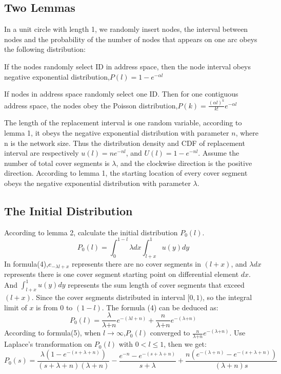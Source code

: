 \documentclass[10pt]{article}
\begin{document}
\subsection{Two Lemmas}
In a unit circle with length 1, we randomly insert   nodes, the interval between nodes and the probability of the number of nodes that appears on one arc obeys the following distribution: 
\begin{lemma}
    If the nodes randomly select ID in address space, then the node interval obeys negative exponential distribution,$P(l)=1-e^{-\alpha{l}}$
\end{lemma}
\begin{lemma}
    If nodes in address space randomly select one ID. Then for one contiguous address space, the nodes obey the Poisson distribution,$P(k)=\frac{(\alpha{l})^k}{k!}e^{-\alpha{l}}$
\end{lemma}
 The length of the replacement interval is one random variable, according to lemma 1,  it obeys the negative exponential distribution with parameter $n$, where n is the network size. Thus the distribution density and CDF of replacement interval are respectively $u(l)=ne^{-nl}$, and $U(l)=1-e^{-nl}$. Assume the number of total cover segments is $\lambda$, and the clockwise direction is the positive direction. According to lemma 1, the starting location of every cover segment obeys the negative exponential distribution with parameter $\lambda$.
 \subsection{The Initial Distribution}
 According to lemma 2, calculate the initial distribution $P_0(l)$.
 \begin{equation}
    P_0(l)=\int _{0}^{1-l}\lambda{dx}\int _{l+x}^{1}u(y)dy
 \end{equation}
 In formula(4),$e_{-\lambda{l+x}}$ represents there are no cover segments in $(l+x)$, and $\lambda{dx}$ represents there is one cover segment starting point on  differential element $dx$. And $\int _{l+x}^{1}u(y)dy$ represents the sum length of cover segments that exceed $(l+x)$. Since the cover segments distributed in interval $[0,1)$, so the  integral limit of $x$ is from $0$ to $(1-l)$.  The formula (4) can be deduced as: 
\begin{equation}
    P_0(l)=\frac{\lambda}{\lambda{+n}}e^{-(\lambda{l}+n)}+\frac{n}{\lambda{+n}}e^{-(\lambda{+n})}
\end{equation}
According to formula(5), when $l\to \infty$,$P_0(l)$ converged to $\frac{n}{\lambda{+n}}e^{-(\lambda{+n})}$. Use Laplace's transformation on $P_0(l)$ with $0<l\leq{1}$, then we get:
\begin{equation}
    P_0(s)=\frac{\lambda (1-e^{-(s+\lambda +n)})}{(s+\lambda +n)(\lambda +n)}-\frac{e^{-n}-e^{-(s+\lambda+n)}}{s+\lambda }+\frac{n(e^{-(\lambda +n)}-e^{-(s+\lambda +n)})}{(\lambda +n)s}
\end{equation}
\end{document}

